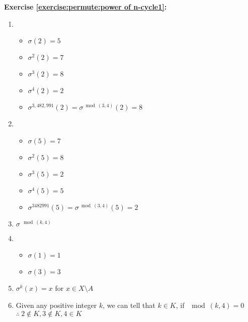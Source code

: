 \noindent\textbf{Exercise \ref{exercise:permute:power of n-cycle1}:} %
\begin{enumerate}[{a.}]
\item
	\begin{itemize}
	\item
	$\sigma(2) = 5$
	
	\item
	$\sigma^2(2) = 7$
	
	\item
	$\sigma^3(2) = 8$
	
	\item
	$\sigma^4(2) = 2$
	
	\item
	$\sigma^{3,482,991}(2) = \sigma^{\bmod{(3,4)}}(2) = 8$
	\end{itemize}
	
\item
	\begin{itemize}
	\item
	$\sigma(5) = 7$
	
	\item
	$\sigma^2(5) = 8$
	
	\item
	$\sigma^3(5) = 2$
	
	\item
	$\sigma^4(5) = 5$
	
	\item
	$\sigma^{3482991}(5) = \sigma^{\bmod{(3,4)}}(5) = 2$
	\end{itemize}
	
\item
$\sigma^{\mod(k,4)}$

\item
	\begin{itemize}
	\item
	$\sigma(1) = 1$
	
	\item
	$\sigma(3) = 3$
	\end{itemize}
	
\item
$\sigma^k(x) = x$ for $x\in X\setminus A$

\item 
Given any positive integer $k$, we can tell that $k \in K$, if $\mod(k,4) = 0$\\
$\therefore\ 2\not\in K, 3\not\in K, 4\in K$
\end{enumerate}

